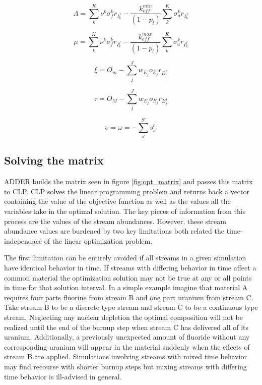 \documentclass[]{elsarticle}
\begin{document}
\begin{equation}
\label{eq:Lambda_bound}
\Lambda = \sum \limits_{k}^{K} \nu^{k} \sigma_{f}^{k} r_{I_{k}^{f}} -
    \frac{k_{eff}^{min}}{(1 - p_{l})} \sum \limits_{k}^{K} \sigma_{a}^{k}
    r_{I_{k}^{f}}
\end{equation}

\begin{equation}
\label{eq:mu_bound}
\mu = \sum \limits_{k}^{K} \nu^{k} \sigma_{f}^{k} r_{I_{k}^{f}} -
    \frac{k_{eff}^{max}}{(1 - p_{l})} \sum \limits_{k}^{K} \sigma_{a}^{k}
    r_{I_{k}^{f}}
\end{equation}

\begin{equation}
\label{eq:xi_bound}
\xi = O_{m} - \sum \limits_{j}^{J} w_{E_{j}} o_{E_{j}} r_{E_{j}^{f}}
\end{equation}

\begin{equation}
\label{eq:tau_bound}
\tau = O_{M} - \sum \limits_{j}^{J} w_{E_{j}} o_{E_{j}} r_{E_{j}^{f}}
\end{equation}

\begin{equation}
\label{eq:upsilon_bound}
\upsilon = \omega = -\sum \limits_{s'}^{S'} s_{s'}^{t}
\end{equation}

\subsection{Solving the matrix} \label{ssec:solving}
ADDER builds the matrix seen in figure \ref{fig:opt_matrix} and passes this
matrix to CLP. CLP solves the linear programming problem and returns back a
vector containing the value of the objective function as well as the values
all the variables take in the optimal solution. The key pieces of information 
from this process are the values of the stream abundances. However, these
stream abundance values are burdened by two key limitations both related the
time-independace of the linear optimization problem. 

The first limitation can be entirely avoided if all streams in a given
simulation have identical behavior in time. If streams with differing behavior
in time affect a common material the optimization solution may not be true at
any or all points in time for that solution interval. In a simple example
imagine that material A requires four parts fluorine from stream B and one part
uranium from stream C. Take stream B to be a discrete type stream and stream C
to be a continuous type stream. Neglecting any nuclear depletion the optimal
composition will not be realized until the end of the burnup step when stream C
has delivered all of its uranium. Additionally, a previously unexpected amount
of fluoride without any corresponding uranium will appear in the material 
suddenly when the effects of stream B are applied.
Simulations involving streams with mixed time
behavior may find recourse with shorter burnup steps but mixing streams with
differing time behavior is ill-advised in general.
\end{document}
